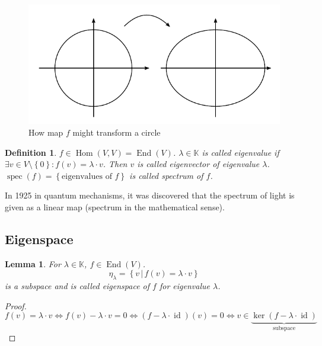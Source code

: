 \documentclass[a4paper]{article}
\newcounter{lecref}[section]
\numberwithin{lecref}{section}
\newtheorem{definition}[lecref]{Definition}
\newtheorem{lemma}[lecref]{Lemma}
\newcommand{\set}[1]{\left\{#1\right\}}
\newcommand{\setdef}[2]{\left\{\left.#1\,\right|\,#2\right\}}
\begin{document}
\begin{figure}[t]
  \begin{center}
    \includegraphics{img/15_screwing_map.pdf}
    \caption{How map $f$ might transform a circle}
  \end{center}
\end{figure}

\begin{definition} %
  $f \in \operatorname{Hom}(V, V) = \operatorname{End}(V)$.
  $\lambda \in \mathbb K$ is called \emph{eigenvalue} if
  $\exists v \in V \setminus \set{0}: f(v) = \lambda \cdot v$.
  Then $v$ is called \emph{eigenvector} of eigenvalue $\lambda$.
  $\operatorname{spec}(f) = \set{\text{eigenvalues of } f}$ is called \emph{spectrum of $f$}.
\end{definition}

In 1925 in quantum mechanisms, it was discovered that the spectrum of light is given as a linear map (spectrum in the mathematical sense).

\subsection{Eigenspace}

\begin{lemma}
  For $\lambda \in \mathbb K$, $f \in \operatorname{End}(V)$.
  \[ \eta_{\lambda} = \setdef{v}{f(v) = \lambda \cdot v} \]
  is a subspace and is called eigenspace of $f$ for eigenvalue $\lambda$.
\end{lemma}
\begin{proof}
  \[  f(v) = \lambda \cdot v \iff f(v) - \lambda \cdot v = 0
      \iff (f - \lambda \cdot \operatorname{id}) (v) = 0
      \iff v \in \underbrace{\operatorname{ker}(f - \lambda \cdot \operatorname{id})}_{\text{subspace}}
  \]
\end{proof}
\end{document}
